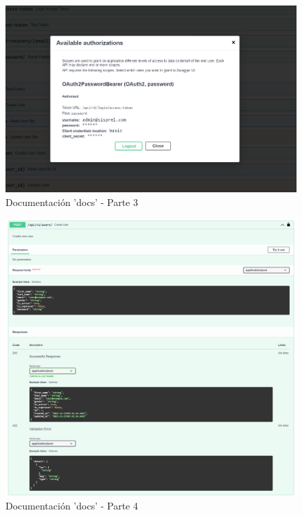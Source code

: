 \begin{figure}[!htb]
    \centering
    \includegraphics[scale=.30]{TT/img/implementacion/docs_3.png}
    \caption{Documentación 'docs' - Parte 3}
    \label{graphic:docs3}
\end{figure}

\begin{figure}[!htb]
    \centering
    \includegraphics[scale=.10]{TT/img/implementacion/docs_4.png}
    \caption{Documentación 'docs' - Parte 4}
    \label{graphic:docs4}
\end{figure}

